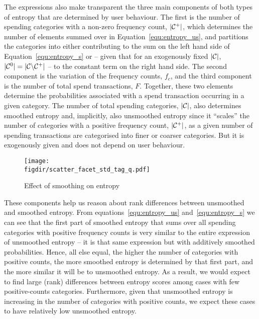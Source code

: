 The expressions also make transparent the three main components of both types
of entropy that are determined by user behaviour. The first is the number of
spending categories with a non-zero frequency count, $|\mathcal{C}^{+}|$, which
determines the number of elements summed over in Equation~\ref{equ:entropy_us},
and partitions the categories into either contributing to the sum on the left
hand side of Equation~\ref{equ:entropy_s} or -- given that for an exogenously
fixed $|\mathcal{C}|$, $|\mathcal{C}^{0}| = |\mathcal{C} \backslash \mathcal{C}^{+}|$ -- to the constant term
on the right hand side. The second component is the variation of the frequency
counts, $f_c$, and the third component is the number of total spend
transactions, $F$. Together, these two elements determine the probabilities
associated with a spend transaction occurring in a given category. The number
of total spending categories, $|\mathcal{C}|$, also determines smoothed entropy and,
implicitly, also unsmoothed entropy since it ``scales'' the number of
categories with a positive frequency count, $|\mathcal{C}^{+}|$, as a given number of
spending transactions are categorised into finer or coarser categories. But it
is exogenously given and does not depend on user behaviour.

\begin{figure}[ht]
    \centering 
    \caption{Effect of smoothing on entropy}
    \label{fig:scatter_facets}
    \texttt{[image: \\figdir/scatter\_facet\_std\_tag\_q.pdf]}
\end{figure}

These components help us reason about rank differences between unsmoothed and
smoothed entropy. From equations~\ref{equ:entropy_us} and~\ref{equ:entropy_s}
we can see that the first part of smoothed entropy that sums over all spending
categories with positive frequency counts is very similar to the entire
expression of unsmoothed entropy -- it is that same expression but with
additively smoothed probabilities. Hence, all else equal, the higher the number
of categories with positive counts, the more smoothed entropy is determined by
that first part, and the more similar it will be to unsmoothed entropy. As a
result, we would expect to find large (rank) differences between entropy scores
among cases with few positive-counts categories. Furthermore, given that
unsmoothed entropy is increasing in the number of categories with positive
counts, we expect these cases to have relatively low unsmoothed entropy.

